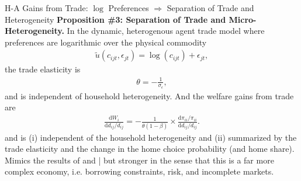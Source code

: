 \documentclass[9pt,pdftex,aspectratio=1610]{beamer}
\theoremstyle{definition}
\begin{document}
\begin{frame}[t]{H-A Gains from Trade: $\log$ Preferences $\Rightarrow$ Separation of Trade and Heterogeneity}
\smallskip
\textbf{Proposition \#3: Separation of Trade and Micro-Heterogeneity.} In the dynamic, heterogenous agent trade model where preferences are logarithmic over the physical commodity
\begin{align}
\tilde{u}( c_{ijt}, \epsilon_{jt} ) =  \log(c_{ijt}) + \epsilon_{jt}, \nonumber
\end{align}
the trade elasticity is
\begin{align}
\theta = -\frac{1}{\sigma_{\epsilon}}, \nonumber
\end{align}
and is independent of household heterogeneity. And the welfare gains from trade are
\begin{align}
\frac{\mathrm{d} W_{i}}{\mathrm{d} d_{ij} / d_{ij}} = -\frac{1}{\theta (1-\beta)} \times \frac{\mathrm{d} \pi_{ii} / \pi_{ii}}{\mathrm{d}d_{ij} / d_{ij}}. \nonumber
\end{align}
and is (i) independent of the household heterogeneity and (ii) summarized by the trade elasticity and the change in the home choice probability (and home share).\\
\bigskip
\medskip
Mimics the results of \citet{anderson1987ces} and \citet{arkolakis2012new}| but stronger in the sense that this is a far more complex economy, i.e. borrowing constraints, risk, and incomplete markets.
\end{frame}

\end{document}
